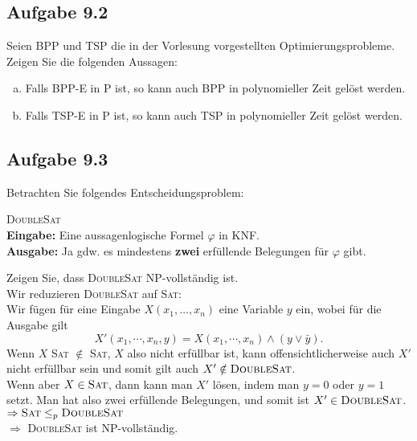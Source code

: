 \subsection*{Aufgabe 9.2}
Seien BPP und TSP die in der Vorlesung vorgestellten Optimierungsprobleme. Zeigen Sie die folgenden Aussagen:
\begin{enumerate}[(a)]
	\item Falls BPP-E in P ist, so kann auch BPP in polynomieller Zeit gelöst werden.
	\item Falls TSP-E in P ist, so kann auch TSP in polynomieller Zeit gelöst werden.
\end{enumerate}
\subsection*{Aufgabe 9.3}
Betrachten Sie folgendes Entscheidungsproblem:
\begin{framed}
	\textsc{DoubleSat}\\
	\textbf{Eingabe:} Eine aussagenlogische Formel $\varphi$ in KNF.\\
	\textbf{Ausgabe:} Ja gdw. es mindestens \textbf{zwei} erfüllende Belegungen für $\varphi$ gibt.
\end{framed}
Zeigen Sie, dass \textsc{DoubleSat} NP-vollständig ist.\\

Wir reduzieren \textsc{DoubleSat} auf \textsc{Sat}:\\
Wir fügen für eine Eingabe $X(x_1, \dots, x_n)$ eine Variable $y$ ein, wobei für die Ausgabe gilt $$X'(x_1, \cdots, x_n, y) = X(x_1, \cdots, x_n) \land (y \lor \bar{y}).$$
Wenn $X$ \textsc{Sat} $\notin$ \textsc{Sat}, $X$ also nicht erfüllbar ist, kann offensichtlicherweise auch $X'$ nicht erfüllbar sein und somit gilt auch $X' \notin \textsc{DoubleSat}$.\\
Wenn aber $X \in \textsc{Sat}$, dann kann man $X'$ lösen, indem man $y=0$ oder $y=1$ setzt. Man hat also zwei erfüllende Belegungen, und somit ist $X' \in \textsc{DoubleSat}$.\\
$\Rightarrow \textsc{Sat} \leq_p \textsc{DoubleSat}$\\
$\Rightarrow$ \textsc{DoubleSat} ist NP-vollständig.